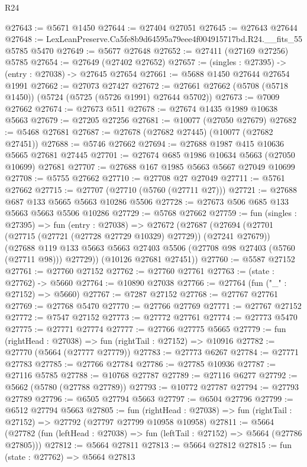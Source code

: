 \begin{lexlean}{R24}
\begin{coremodule}
@27643 := @5671 @1450
@27644 := @27404 @27051
@27645 := @27643 @27644
@27648 := LexLeanPreserve.Ca5fe8b9d64595a79eee4f004915717bd.R24.__fits_55 @5785 @5470
@27649 := @5677 @27648
@27652 := @27411 (@27169 @27256) @5785
@27654 := @27649 (@27402 @27652)
@27657 := (singles : @27395) -> (entry : @27038) -> @27645 @27654
@27661 := @5688 @1450 @27644 @27654 @1991
@27662 := @27073 @27427
@27672 := @27661 @27662 (@5708 (@5718 @1450)) (@5724 (@5725 (@5726 @1991) @27644 @5702))
@27673 := @7009 @27662
@27674 := @27673 @511
@27678 := @27674 @1435 @1989 @10638 @5663
@27679 := @27205 @27256
@27681 := @10077 (@27050 @27679)
@27682 := @5468 @27681
@27687 := @27678 (@27682 @27445) (@10077 (@27682 @27451))
@27688 := @5746 @27662
@27694 := @27688 @1987 @415 @10636 @5665 @27681 @27445
@27701 := @27674 @685 @1986 @10634 @5663 (@27050 @10699) @27681
@27707 := @27688 @167 @1985 @5663 @5667 @27049 @10699
@27708 := @5755 @27662
@27710 := @27708 @27 @27049
@27711 := @5761 @27662
@27715 := @27707 (@27710 (@5760 (@27711 @27)))
@27721 := @27688 @687 @133 @5665 @5663 @10286 @5506
@27728 := @27673 @506 @685 @133 @5663 @5663 @5506 @10286
@27729 := @5768 @27662
@27759 := fun (singles : @27395) =>
  fun (entry : @27038) =>
  @27672
    (@27687
      (@27694
        (@27701 (@27715 (@27721 (@27728 @27729 @10329) @27729)) (@27241 @27679))
        (@27688 @119 @133 @5663 @5663 @27403 @5506 (@27708 @98 @27403 (@5760 (@27711 @98))) @27729))
      (@10126 @27681 @27451))
@27760 := @5587 @27152
@27761 := @27760 @27152
@27762 := @27760 @27761
@27763 := (state : @27762) -> @5660
@27764 := @10890 @27038
@27766 := @27764 (fun ("_" : @27152) => @5660)
@27767 := @7287 @27152
@27768 := @27767 @27761
@27769 := @27768 @5470
@27770 := @27766 @27769
@27771 := @27767 @27152
@27772 := @7547 @27152
@27773 := @27772 @27761
@27774 := @27773 @5470
@27775 := @27771 @27774
@27777 := @27766 @27775 @5665
@27779 := fun (rightHead : @27038) => fun (rightTail : @27152) => @10916
@27782 := @27770 (@5664 (@27777 @27779))
@27783 := @27773 @6267
@27784 := @27771 @27783
@27785 := @27766 @27784
@27786 := @27785 @10936
@27787 := @27116 @5785
@27788 := @10768 @27787
@27789 := @27116 @6277
@27792 := @5662 (@5780 (@27788 @27789))
@27793 := @10772 @27787
@27794 := @27793 @27789
@27796 := @6505 @27794 @5663
@27797 := @6504 @27796
@27799 := @6512 @27794 @5663
@27805 := fun (rightHead : @27038) =>
  fun (rightTail : @27152) => @27792 (@27797 @27799 @10958 @10958)
@27811 := @5664
    (@27782 (fun (leftHead : @27038) => fun (leftTail : @27152) => @5664 (@27786 @27805)))
@27812 := @5664 @27811
@27813 := @5664 @27812
@27815 := fun (state : @27762) => @5664 @27813

\end{coremodule}
\end{lexlean}
